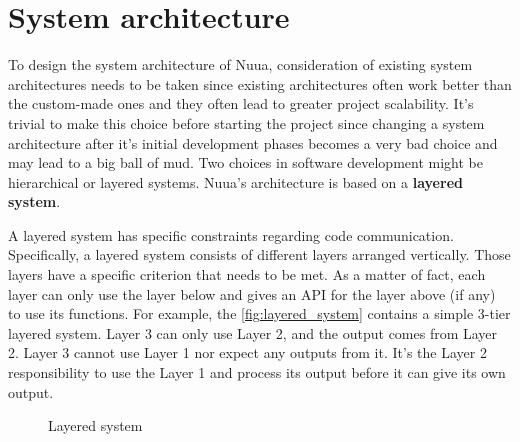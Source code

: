 \section{System architecture}

To design the system architecture of Nuua, consideration of existing system architectures needs to be taken since existing architectures
often work better than the custom-made ones and they often lead to greater project scalability. It's trivial
to make this choice before starting the project since changing a system architecture after it's initial
development phases becomes a very bad choice and may lead to a big ball of mud. Two choices in software development might be hierarchical
or layered systems. Nuua's architecture is based on a \textbf{layered system}.

A layered system has specific constraints regarding code communication. Specifically, a layered system consists
of different layers arranged vertically. Those layers have a specific criterion that needs to be met. As a matter of fact,
each layer can only use the layer below and gives an API for the layer above (if any) to use its functions. For example,
the \autoref{fig:layered_system} contains a simple 3-tier layered system. Layer 3 can only use Layer 2, and the output comes
from Layer 2. Layer 3 cannot use Layer 1 nor expect any outputs from it. It's the Layer 2 responsibility to use the Layer 1
and process its output before it can give its own output.

\begin{figure}[H]
    \centering

    \caption{Layered system}
    \label{fig:layered_system}
\end{figure}

